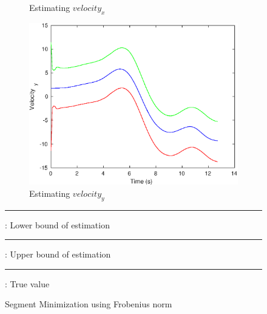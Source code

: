 \begin{figure}[h!]
\begin{subfigure}{.5\textwidth}
\caption{Estimating $velocity_x$}
\end{subfigure}
\begin{subfigure}{.5\textwidth}
\centering
\includegraphics[width=.8\linewidth]{figures/s_caVelocity_y}
\caption{Estimating $velocity_y$}
\end{subfigure}
{\color{red}\rule{.1\linewidth}{1pt}} : Lower bound of estimation\\
{\color{green}\rule{.1\linewidth}{1pt}} : Upper bound of estimation\\
{\color{blue}\rule{.1\linewidth}{1pt}} : True value
\caption{Segment Minimization using Frobenius norm}
\label{fig:segmentminimization}
\end{figure}

